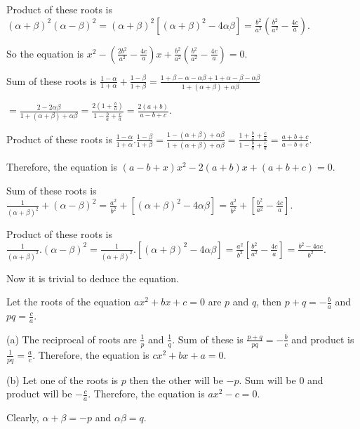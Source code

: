     Product of these roots is $(\alpha + \beta)^2(\alpha - \beta)^2 = (\alpha + \beta)^2[(\alpha +
      \beta)^2 - 4\alpha\beta] = \frac{b^2}{a^2}\left(\frac{b^2}{a^2} - \frac{4c}{a}\right)$.

    So the equation is $x^2 -\left(\frac{2b^2}{a^2} - \frac{4c}{a}\right)x +
    \frac{b^2}{a^2}\left(\frac{b^2}{a^2} - \frac{4c}{a}\right) = 0$.
  \item Sum of these roots is $\frac{1 - \alpha}{1 + \alpha} + \frac{1 - \beta}{1 + \beta} = \frac{1 +
    \beta - \alpha -\alpha\beta + 1 + \alpha - \beta -\alpha\beta}{1 + (\alpha + \beta) + \alpha\beta}$

    $= \frac{2 - 2\alpha\beta}{1 + (\alpha + \beta) + \alpha\beta} = \frac{2\left(1 +
    \frac{b}{a}\right)}{1 - \frac{b}{a} + \frac{c}{a}} = \frac{2(a + b)}{a - b + c}$.

    Product of these roots is $\frac{1 - \alpha}{1 + \alpha}.\frac{1 - \beta}{1 + \beta} = \frac{1
      -(\alpha + \beta) + \alpha\beta}{1 + (\alpha + \beta) + \alpha\beta} = \frac{1 + \frac{b}{a} +
      \frac{c}{a}}{1 - \frac{b}{a} + \frac{c}{a}} = \frac{a + b + c}{a - b + c}$.

    Therefore, the equation is $(a - b + x)x^2 - 2(a + b)x + (a + b + c) = 0$.
  \item Sum of these roots is $\frac{1}{(\alpha + \beta)^2} + (\alpha - \beta)^2 = \frac{a^2}{b^2} +
    [(\alpha + \beta)^2 - 4\alpha\beta] = \frac{a^2}{b^2} + \left[\frac{b^2}{a^2} - \frac{4c}{a}\right]$.

    Product of these roots is $\frac{1}{(\alpha + \beta)^2}.(\alpha - \beta)^2 = \frac{1}{(\alpha +
      \beta)^2}.[(\alpha + \beta)^2 - 4\alpha\beta] = \frac{a^2}{b^2}\left[\frac{b^2}{a^2} -
      \frac{4c}{a}\right] = \frac{b^2 - 4ac}{b^2}$.

    Now it is trivial to deduce the equation.
  \stopitemize
\item Let the roots of the equation $ax^2 + bx + c = 0$ are $p$ and $q$, then $p + q = -\frac{b}{a}$ and $pq
  = \frac{c}{a}$.

  (a) The reciprocal of roots are $\frac{1}{p}$ and $\frac{1}{q}$. Sum of these is $\frac{p + q}{pq} =
  -\frac{b}{c}$ and product is $\frac{1}{pq} = \frac{a}{c}$. Therefore, the equation is $cx^2 + bx + a = 0$.

  (b) Let one of the roots is $p$ then the other will be $-p$. Sum will be $0$ and product will be
  $-\frac{c}{a}$. Therefore, the equation is $ax^2 - c = 0$.
\item Clearly, $\alpha + \beta = -p$ and $\alpha\beta = q$.

